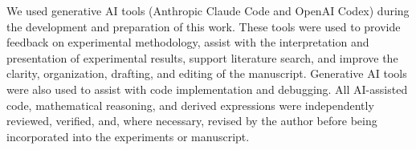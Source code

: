 We used generative AI tools (Anthropic Claude Code and OpenAI Codex) during the development and preparation of this
work. These tools were used to provide feedback on experimental methodology, assist with the interpretation and
presentation of experimental results, support literature search, and improve the clarity, organization, drafting, and
editing of the manuscript. Generative AI tools were also used to assist with code implementation and debugging. All
AI-assisted code, mathematical reasoning, and derived expressions were independently reviewed, verified, and, where
necessary, revised by the author before being incorporated into the experiments or manuscript.
